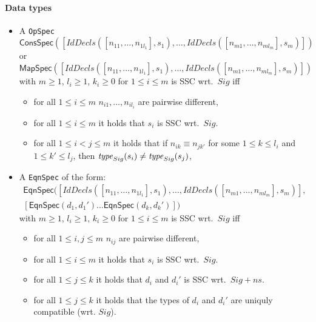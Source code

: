\documentclass[fleqn,a4paper]{article}
\newcommand{\aterm}[1]{\mathsf{#1}}
\begin{document}
\paragraph{Data types}
\begin{itemize}
\item
  A {\tt OpSpec}\\
  $\aterm{ConsSpec}([IdDecls([n_{11},\dots,n_{1l_1}],s_1),\dots,IdDecls([n_{m1},\dots,n_{ml_m}],s_m)])$
  or\\
  $\aterm{MapSpec}([IdDecls([n_{11},\dots,n_{1l_1}],s_1),\dots,IdDecls([n_{m1},\dots,n_{ml_m}],s_m)])$
  with $m\geq 1$, $l_i\geq 1$, $k_i\geq 0$ for $1\leq i\leq m$
  is SSC wrt.\ $Sig$ iff
  \begin{itemize}
  \item
    for all $1\leq i\leq m$  $n_{i1},\ldots,n_{il_i}$ are
    pairwise different,
  \item
    for all $1\leq i\leq m$ it holds that $s_i$ is SSC wrt.\ $Sig$.
  \item
    for all $1\leq i<j\leq m$ it holds that
    if $n_{ik}\equiv n_{jk'}$ for some $1\leq k\leq l_i$ and $1\leq
    k'\leq l_j$, then $\mathit{type}_{Sig}(s_i)\neq\mathit{type}_{Sig}(s_j)$,
  \end{itemize}
\item
  A {\tt EqnSpec} of the form:\\
\begin{gather}
  \aterm{EqnSpec}([IdDecls([n_{11},\ldots,n_{1l_1}],s_1),\dots,IdDecls([n_{m1},\ldots,n_{ml_m}],s_m)],\\
  [\aterm{EqnSpec}(d_1,d_1')\dots\aterm{EqnSpec}(d_k,d_k')])
\end{gather}
  with $m\geq 1$, $l_i\geq 1$, $k_i\geq 0$ for $1\leq i\leq m$
  is SSC wrt.\ $Sig$ iff
  \begin{itemize}
  \item
    for all $1\leq i,j\leq m$  $n_{ij}$ are pairwise different,
  \item
    for all $1\leq i\leq m$ it holds that $s_i$ is SSC wrt.\ $Sig$.
  \item
    for all $1\leq j\leq k$ it holds that $d_i$ and $d_i'$ is SSC wrt.\ $Sig+ns$.
  \item
    for all $1\leq j\leq k$ it holds that the types of $d_i$ and $d_i'$ are uniquly compatible (wrt. $Sig$).
  \end{itemize}
\end{itemize}
\end{document}
